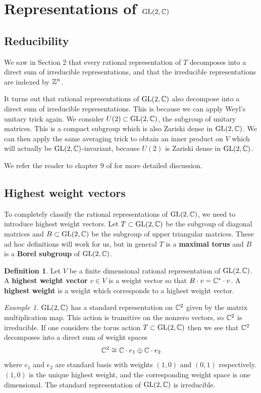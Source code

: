 \documentclass{amsart}
\numberwithin{equation}{section}
\theoremstyle{plain} %
\theoremstyle{definition}
\newtheorem{definition}[equation]{Definition}
\theoremstyle{remark}
\newtheorem{example}[equation]{Example}
\begin{document}
\section{Representations of $\operatorname{GL}(2,\mathbb{C})$}

\subsection{Reducibility}
We saw in Section 2 that every rational representation of $T$ decomposes into a direct sum of irreducible representations,
and that the irreducible representations are indexed by $\mathbb{Z}^n$.

\hfill

It turns out that rational representations of $\operatorname{GL}(2,\mathbb{C})$
also decompose into a direct sum of irreducible representations. This is
because we can apply Weyl's unitary trick again. We consider $U(2)\subset \operatorname{GL}(2,\mathbb{C})$, the subgroup of unitary matrices.
This is a compact subgroup which is also Zariski dense in $\operatorname{GL}(2,\mathbb{C})$. We can then apply the same averaging trick
to obtain an inner product on $V$ which will actually be $\operatorname{GL}(2,\mathbb{C})$-invariant, because $U(2)$ is Zariski dense in $\operatorname{GL}(2,\mathbb{C})$.

\hfill 

We refer the reader to chapter 9 of \cite{fulton-harris} for more detailed discussion.


\subsection{Highest weight vectors}
To completely classify the rational representations of $\operatorname{GL}(2,\mathbb{C})$, we need to introduce highest weight vectors.
Let $T\subset \operatorname{GL}(2,\mathbb{C})$ be the subgroup of diagonal matrices and $B \subset \operatorname{GL}(2,\mathbb{C})$ be the subgroup of upper triangular matrices.
These ad hoc definitions will work for us, but in general $T$ is a \textbf{maximal torus} and $B$ is a \textbf{Borel subgroup} of $\operatorname{GL}(2,\mathbb{C})$.
\begin{definition}
	Let $V$ be a finite dimensional rational representation of $\operatorname{GL}(2,\mathbb{C})$. A \textbf{highest weight vector} $v\in V$ is
	a weight vector so that $B\cdot v = \mathbb{C}^*\cdot v$. A \textbf{highest weight} is a weight which
	corresponds to a highest weight vector.
\end{definition}

\begin{example}
	$\operatorname{GL}(2,\mathbb{C})$ has a standard representation on $\mathbb{C}^2$ given by the matrix multiplication map. This action
	is transitive on the nonzero vectors, so $\mathbb{C}^2$ is irreducible. If one considers the torus action $T\subset \operatorname{GL}(2,\mathbb{C})$
	then we see that $\mathbb{C}^2$ decomposes into a direct sum of weight spaces \begin{align*}
		\mathbb{C}^2 \cong \mathbb{C}\cdot e_1 \oplus \mathbb{C}\cdot e_2
	\end{align*} where $e_1$ and $e_2$ are standard basis with weights $(1,0)$ and $(0,1)$ respectively.
	$(1,0)$ is the unique highest weight, and the corresponding weight space is one dimensional. The standard
	representation of $\operatorname{GL}(2,\mathbb{C})$ is irreducible.
\end{example}
\end{document}

